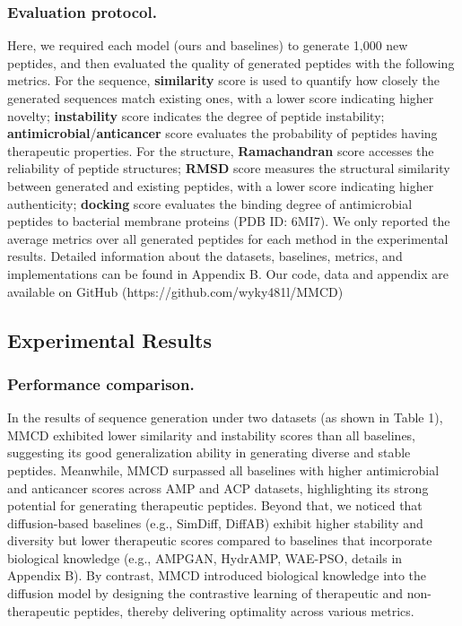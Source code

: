 \documentclass[letterpaper]{article}
\begin{document}
\subsubsection{Evaluation protocol.}
Here, we required each model (ours and baselines) to generate 1,000 new peptides, and then evaluated the quality of generated peptides with the following metrics. For the sequence, \textbf{similarity} score is used to quantify how closely the generated sequences match existing ones, with a lower score indicating higher novelty; \textbf{instability} score \cite{mullerModlAMPPython2017} indicates the degree of peptide instability; \textbf{antimicrobial}/\textbf{anticancer} score evaluates the probability of peptides having therapeutic properties. For the structure, \textbf{Ramachandran} score \cite{hollingsworthFreshLook2010} accesses the reliability of peptide structures; \textbf{RMSD} score measures the structural similarity between generated and existing peptides, with a lower score indicating higher authenticity; \textbf{docking} score \cite{florez-castilloIbM6Antimicrobial2020} evaluates the binding degree of antimicrobial peptides to bacterial membrane proteins (PDB ID: 6MI7). We only reported the average metrics over all generated peptides for each method in the experimental results. Detailed information about the datasets, baselines, metrics, and implementations can be found in Appendix B. Our code, data and appendix are available on GitHub (https://github.com/wyky481l/MMCD)

\subsection{Experimental Results}
\subsubsection{Performance comparison.}
In the results of sequence generation under two datasets (as shown in Table 1), MMCD exhibited lower similarity and instability scores than all baselines, suggesting its good generalization ability in generating diverse and stable peptides. Meanwhile, MMCD surpassed all baselines with higher antimicrobial and anticancer scores across AMP and ACP datasets, highlighting its strong potential for generating therapeutic peptides. Beyond that, we noticed that diffusion-based baselines (e.g., SimDiff, DiffAB) exhibit higher stability and diversity but lower therapeutic scores compared to baselines that incorporate biological knowledge (e.g., AMPGAN, HydrAMP, WAE-PSO, details in Appendix B). By contrast, MMCD introduced biological knowledge into the diffusion model by designing the contrastive learning of therapeutic and non-therapeutic peptides, thereby delivering optimality across various metrics.
\end{document}
